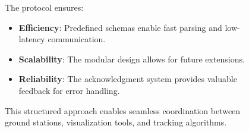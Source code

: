 \begin{figure}[H]
\begin{minipage}{0.5\textwidth}
		The protocol ensures:
		\begin{itemize}
			\item \textbf{Efficiency}: Predefined schemas enable fast parsing and low-latency communication.
			\item \textbf{Scalability}: The modular design allows for future extensions.
			\item \textbf{Reliability}: The acknowledgment system provides valuable feedback for error handling.
		\end{itemize}
		
		This structured approach enables seamless coordination between ground stations, visualization tools, and tracking algorithms.
		
	\end{minipage}%
	\hfill
	\begin{minipage}{0.38\textwidth} %
		\centering

\end{minipage}
\end{figure}
